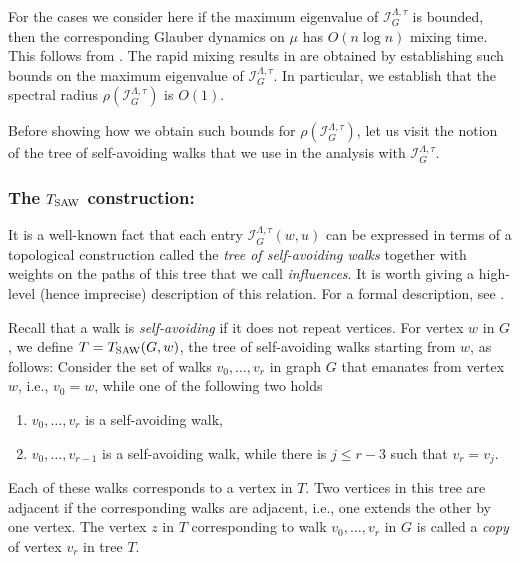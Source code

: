 \documentclass[11pt,reqno]{amsart}
\numberwithin{equation}{section}
\newcommand{\cI}{{\mathcal{I}}}
\newcommand{\blue}[1]{{\color{blue}#1}}
\newcommand{\bostonuniversityred}[1]{{\color{bostonuniversityred}#1}}
\newcommand{\cadmiumgreen}[1]{{\color{cadmiumgreen}#1}}
\newcommand{\coquelicot}[1]{{\color{coquelicot}#1}}
\newcommand{\electricviolet}[1]{{\color{electricviolet}#1}}
\newcommand{\red}[1]{{\color{red}#1}}
\newcommand{\Tsaw}{T_{\rm SAW}}
\newcommand{\infmatrix}{\cI}
\newcommand{\spradius}{{\rho}}
\renewcommand{\blue}[1]{#1}
\renewcommand{\bostonuniversityred}[1]{#1}
\renewcommand{\cadmiumgreen}[1]{#1}
\renewcommand{\coquelicot}[1]{#1}
\renewcommand{\electricviolet}[1]{#1}
\renewcommand{\red}[1]{#1}
\newcommand{\kj}{\coquelicot{j}}
\newcommand{\kr}{\bostonuniversityred{r}}%
\newcommand{\ku}{\red{u}}
\newcommand{\kv}{\electricviolet{v}}
\newcommand{\kw}{\blue{w}}
\newcommand{\kz}{\cadmiumgreen{z}}
\renewcommand{\kj}{j}
\renewcommand{\kr}{r}
\renewcommand{\ku}{u}
\renewcommand{\kv}{v}
\renewcommand{\kw}{w}
\renewcommand{\kz}{z}
\begin{document}
 
For the cases we consider here if the maximum eigenvalue of  $\infmatrix^{\Lambda,\tau}_{G}$ is bounded, 
% 
then the corresponding Glauber dynamics on $\mu$ has
 $O(n\log n)$  mixing time. This follows from  \cite{VigodaSpectralIndB}. 
%
The rapid mixing results  in  are obtained by establishing  such bounds on 
the maximum eigenvalue of  $\infmatrix^{\Lambda,\tau}_{G}$. In particular, we establish that the spectral radius 
$\spradius( \infmatrix^{\Lambda,\tau}_{G})$ is $O(1)$. 

Before showing how we obtain such bounds for $\spradius( \infmatrix^{\Lambda,\tau}_{G})$, let us visit 
the notion of the tree of self-avoiding walks that we use in the analysis with $\infmatrix^{\Lambda,\tau}_{G}$. 



\subsubsection*{The $\Tsaw$ construction:}
It is a well-known fact that each entry $\infmatrix^{\Lambda,\tau}_{G}(\kw,\ku)$ can 
be expressed in terms of a topological construction called the {\em tree of self-avoiding walks} 
together with weights on the paths of this tree that we call {\em influences}. 
%
%
It is worth giving a high-level (hence imprecise) description of this relation. For a formal description,  
see . 


Recall that a walk is {\em self-avoiding} if it does not repeat vertices. For vertex $\kw$ in $G$, we 
define $T=\Tsaw(G,\kw)$, the tree of self-avoiding walks starting from $\kw$, as follows: Consider 
the set of walks $\kv_0, \ldots, \kv_{\kr}$ in graph $G$ that emanates from vertex $\kw$, i.e., 
$\kv_0=\kw$, while one of the following two holds
\begin{enumerate}
\item $\kv_0, \ldots, \kv_{\kr}$ is a self-avoiding walk,
\item $\kv_0, \ldots, \kv_{\kr-1}$ is a self-avoiding walk, while there is $\kj\leq \kr-3$ such that $\kv_{\kr}=\kv_{\kj}$.
\end{enumerate}
%
Each of these walks  corresponds to a vertex in  $T$. Two vertices in this tree are adjacent  if the 
corresponding walks are adjacent, i.e., one extends the other by one vertex.  The vertex $\kz$ in 
$T$ corresponding to walk $\kv_0, \ldots, \kv_{\kr}$ in $G$ is called a {\em copy} of vertex $\kv_{\kr}$ 
in  tree $T$.
\end{document}
